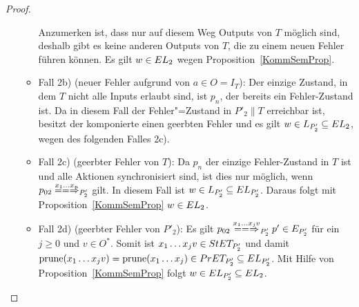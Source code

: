 \begin{proof}
\begin{itemize}
\begin{itemize}
          Anzumerken ist, dass nur auf diesem Weg Outputs von $T$ möglich sind,
          deshalb gibt es keine anderen Outputs von $T$, die zu einem neuen
          Fehler führen können. Es gilt $w\in EL _2$ wegen
          Proposition~\ref{KommSemProp}.
        \item Fall 2b) (neuer Fehler aufgrund von $a\in O=I_T$): Der einzige
          Zustand, in dem $T$ nicht alle Inputs erlaubt sind, ist $p_n$, der
          bereits ein Fehler-Zustand ist. Da in diesem Fall der Fehler"=Zustand
          in $P'_2\|T$ erreichbar ist, besitzt der komponierte \MEIO{} einen
          geerbten Fehler und es gilt $w\in L_{P'_2}\subseteq EL _2$, wegen
          des folgenden Falles 2c).
        \item Fall 2c) (geerbter Fehler von $T$): Da $p_n$ der einzige
          Fehler-Zustand in $T$ ist und alle Aktionen synchronisiert sind, ist
          dies nur möglich, wenn $p_{02} \lweakmay[x_1\dots x_n]_{P'_2}$ gilt.
          In diesem Fall ist $w\in L_{P'_2}\subseteq EL _{P'_2}$. Daraus
          folgt mit Proposition~\ref{KommSemProp} $w\in EL _2$.
        \item Fall 2d) (geerbter Fehler von $P'_2$): Es gilt $p_{02}
          \lweakmay[x_1\dots x_j v]_{P'_2} p'\in E_{P'_2}$ für ein $j\geq 0$ und
          $v\in O^*$. Somit ist $x_1\dots x_j v\in StET _{P'_2}$ und damit
          $\mathrm{prune} (x_1\dots x_j v) =\mathrm{prune} (x_1\dots x_j)\in PrET
          _{P'_2}\subseteq EL _{P'_2}$. Mit Hilfe von
          Proposition~\ref{KommSemProp} folgt $w\in EL _{P'_2}\subseteq EL
          _2$.
      \end{itemize}
  \end{itemize}
\end{proof}

